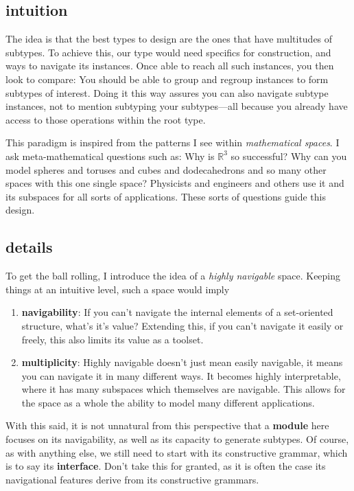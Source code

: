 \documentclass[twoside]{article}
\begin{document}
\vspace{0.5cm}

\subsection*{intuition}

The idea is that the best types to design are the ones that have multitudes of subtypes. To achieve this, our type
would need specifics for construction, and ways to navigate its instances. Once able to reach all such instances,
you then look to compare: You should be able to group and regroup instances to form subtypes of interest. Doing
it this way assures you can also navigate subtype instances, not to mention subtyping your subtypes---all
because you already have access to those operations within the root type.

This paradigm is inspired from the patterns I see within \emph{mathematical spaces}. I ask meta-mathematical questions
such as: Why is $ \mathbb{R}^3 $ so successful? Why can you model spheres and toruses and cubes and dodecahedrons and
so many other spaces with this one single space? Physicists and engineers and others use it and its subspaces for all
sorts of applications. These sorts of questions guide this design.

\newpage

\subsection*{details}

To get the ball rolling, I introduce the idea of a \emph{highly navigable} space. Keeping things at an intuitive
level, such a space would imply

\begin{enumerate}
\item {\bf navigability}: If you can't navigate the internal elements of a set-oriented structure, what's it's value?
			  Extending this, if you can't navigate it easily or freely, this also limits its value as
			  a toolset.
\item {\bf multiplicity}: Highly navigable doesn't just mean easily navigable, it means you can navigate it in many
			  different ways. It becomes highly interpretable, where it has many subspaces which themselves
			  are navigable. This allows for the space as a whole the ability to model many different
			  applications.
\end{enumerate}

With this said, it is not unnatural from this perspective that a {\bf module} here focuses on its navigability, as well
as its capacity to generate subtypes. Of course, as with anything else, we still need to start with its constructive
grammar, which is to say its {\bf interface}. Don't take this for granted, as it is often the case its navigational
features derive from its constructive grammars.
\end{document}
